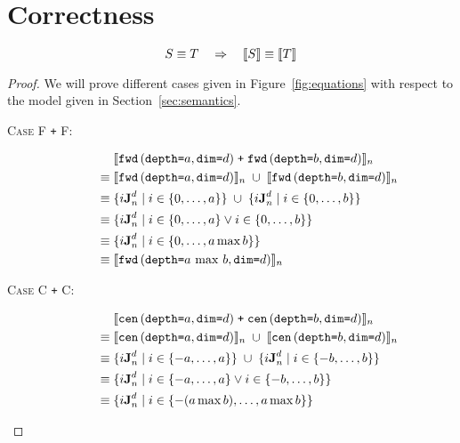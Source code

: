 \section{Correctness}


\begin{theorem}[Soundness]
\[
S \equiv T
\quad
\Rightarrow
\quad
\interp{S} \equiv \interp{T}
\]
\end{theorem}

\begin{proof}
We will prove different cases given in Figure~\ref{fig:equations} with respect
to the model given in Section~\ref{sec:semantics}.

\begin{description}
  \item[\textsc{Case F \texttt{+} F}:]
    \begin{align*}
      & \; \interp{\stenFwdS{a}{d} \; \texttt{+} \; \stenFwdS{b}{d}}_{n} \\
      \equiv & \; \interp{\stenFwdS{a}{d}}_{n} \; \cup \; \interp{\stenFwdS{b}{d}}_{n} \\
      \equiv & \; \{i\singleEntry{d}{n} \mid i \in \{0, \ldots, a\} \} \; \cup \;
                  \{i\singleEntry{d}{n} \mid i \in \{0, \ldots, b\} \} \\
      \equiv & \; \{i\singleEntry{d}{n} \mid i \in \{0, \ldots, a\}
                    \vee i \in \{0, \ldots, b\} \} \\
      \equiv & \; \{i\singleEntry{d}{n} \mid i \in \{0, \ldots, a \max b\} \} \\
      \equiv & \; \interp{\stenFwdS{a \, \max \, b}{d}}_n \\
    \end{align*}
  \item[\textsc{Case C \texttt{+} C}:]
    \begin{align*}
      & \; \interp{\stenCenS{a}{d} \; \texttt{+} \; \stenCenS{b}{d}}_{n} \\
      \equiv & \; \interp{\stenCenS{a}{d}}_{n} \; \cup \; \interp{\stenCenS{b}{d}}_{n} \\
      \equiv & \; \{i\singleEntry{d}{n} \mid i \in \{-a, \ldots, a\} \} \; \cup \;
                  \{i\singleEntry{d}{n} \mid i \in \{-b, \ldots, b\} \} \\
      \equiv & \; \{i\singleEntry{d}{n} \mid i \in \{-a, \ldots, a\}
                    \vee i \in \{-b, \ldots, b\} \} \\
      \equiv & \; \{i\singleEntry{d}{n} \mid i \in \{- (a \max b), \ldots, a \max b\} \} \\

\end{align*}
\end{description}
\end{proof}
